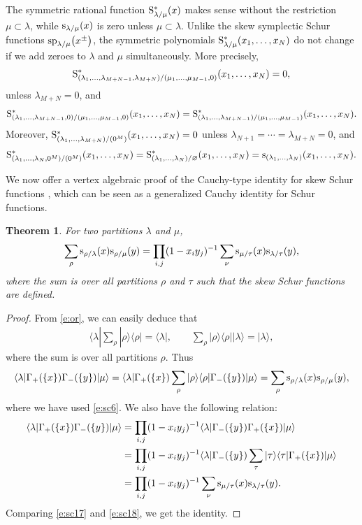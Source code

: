 \documentclass[10pt,a4paper]{amsart}
\numberwithin{equation}{section}
\newtheorem{Theorem}{Theorem}[section]
\begin{document}
\begin{Remark}
The symmetric rational function ${\rm S}^*_{\lambda/\mu}(x)$ makes sense without the restriction $\mu\subset\lambda$, while ${\rm s}_{\lambda/\mu}(x)$ is zero unless $\mu\subset\lambda$. Unlike the skew symplectic Schur functions ${\rm sp}_{\lambda/\mu}\big(x^{\pm}\big)$, the symmetric
polynomials ${\rm S}^*_{\lambda/\mu}(x_1,\dots,x_N)$
do not change if we add zeroes to $\lambda$ and $\mu$ simultaneously.
More precisely,
\[
{\rm S}^*_{(\lambda_1,\dots,\lambda_{M+N-1},\lambda_{M+N})/(\mu_1,\dots,\mu_{M-1},0)}(x_1,\dots,x_N)=0,
\]
 unless $\lambda_{M+N}=0$, and
\[
{\rm S}^*_{(\lambda_1,\dots,\lambda_{M+N-1},0)/(\mu_1,\dots,\mu_{M-1},0)}(x_1,\dots,x_N)={\rm S}^*_{(\lambda_1,\dots,\lambda_{M+N-1})/(\mu_1,\dots,\mu_{M-1})}(x_1,\dots,x_N).
\]
Moreover,
${\rm S}^*_{(\lambda_1,\dots,\lambda_{M+N})/(0^M)}(x_1,\dots,x_N)=0$ unless $\lambda_{N+1}=\cdots=\lambda_{M+N}=0$,
 and
 \[
 {\rm S}^*_{(\lambda_1,\dots,\lambda_{N},0^M)/(0^M)}(x_1,\dots,x_N)={\rm S}^*_{(\lambda_1,\dots,\lambda_{N})/\varnothing}(x_1,\dots,x_N)
 ={\rm s}_{(\lambda_1,\dots,\lambda_{N})}(x_1,\dots,x_N).
 \]
\end{Remark}
We now offer a vertex algebraic proof of the Cauchy-type identity for skew Schur functions \mbox{\cite[p.~93]{Mac1995}}, which can be seen as a generalized Cauchy identity for Schur functions.
\begin{Theorem}For two partitions $\lambda$ and $\mu$,
\[
\sum_\rho {\rm s}_{\rho/\lambda}(x){\rm s}_{\rho/\mu}(y)=\prod_{i,j}(1-x_iy_j)^{-1}\sum_\nu {\rm s}_{\mu/\tau}(x){\rm s}_{\lambda/\tau}(y),
\]
where the sum is over all partitions $\rho$ and $\tau$ such that the skew Schur functions are defined.
\end{Theorem}
\begin{proof}
From \eqref{e:or}, we can easily deduce that
\begin{align*}%
\langle\lambda|\sum_{\rho}|\rho\rangle\langle\rho|=\langle\lambda|,\qquad \sum_{\rho}|\rho\rangle\langle\rho||\lambda\rangle=|\lambda\rangle,
\end{align*}
where the sum is over all partitions $\rho$.
Thus
\begin{align}\label{e:sc17}
\langle \lambda|\Gamma_+(\{x\})\Gamma_-(\{y\})|\mu\rangle
=\langle \lambda|\Gamma_+(\{x\})\sum_{\rho}|\rho\rangle\langle\rho|\Gamma_-(\{y\})|\mu\rangle
=\sum_\rho {\rm s}_{\rho/\lambda}(x){\rm s}_{\rho/\mu}(y),
\end{align}
where we have used \eqref{e:sc6}. We also have the following relation:
\begin{align}
\notag\langle \lambda|\Gamma_+(\{x\})\Gamma_-(\{y\})|\mu\rangle &{}= \prod_{i,j}(1-x_iy_j)^{-1}\langle \lambda|\Gamma_-(\{y\})\Gamma_+(\{x\})|\mu\rangle\\
\notag &{}=\prod_{i,j}(1-x_iy_j)^{-1}\langle \lambda|\Gamma_-(\{y\})\sum_{\tau}|\tau\rangle\langle\tau|\Gamma_+(\{x\})|\mu\rangle\\
 &{}= \prod_{i,j}(1-x_iy_j)^{-1}\sum_\nu {\rm s}_{\mu/\tau}(x){\rm s}_{\lambda/\tau}(y).\label{e:sc18}
\end{align}
Comparing \eqref{e:sc17} and \eqref{e:sc18}, we get the identity.
\end{proof}
\end{document}
